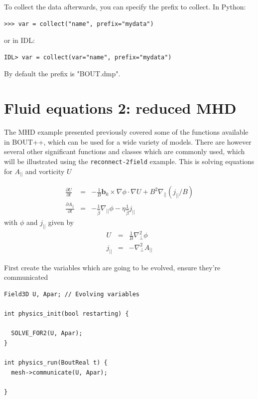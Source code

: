 \documentclass[12pt]{article}
\newcommand{\deriv}[2]{\ensuremath{\frac{\partial #1}{\partial #2}}}
\begin{document}
To collect the data afterwards, you can specify the prefix to collect. In Python:
\begin{verbatim}
>>> var = collect("name", prefix="mydata")
\end{verbatim}
or in IDL:
\begin{verbatim}
IDL> var = collect(var="name", prefix="mydata")
\end{verbatim}

By default the prefix is "BOUT.dmp".


\section{Fluid equations 2: reduced MHD}

The MHD example presented previously covered some of the functions available in BOUT++,
which can be used for a wide variety of models. There are however several other significant
functions and classes which are commonly used, which will be illustrated using the
\texttt{reconnect-2field} example. This is solving equations for $A_{||}$ and
vorticity $U$

\begin{eqnarray*}
\deriv{U}{t} &=& -\frac{1}{B}\mathbf{b}_0\times\nabla\phi\cdot\nabla U + B^2 \nabla_{||}\left(j_{||} / B\right) \\
\deriv{A_{||}}{t} &=& -\frac{1}{\hat{\beta}}\nabla_{||}\phi - \eta\frac{1}{\hat{\beta}} j_{||}
\end{eqnarray*}
with $\phi$ and $j_{||}$ given by
\begin{eqnarray*}
U &=& \frac{1}{B}\nabla_\perp^2\phi \\
j_{||} &=& -\nabla_\perp^2 A_{||}
\end{eqnarray*}

First create the variables which are going to be evolved, ensure they're
communicated

\begin{lstlisting}
Field3D U, Apar; // Evolving variables

int physics_init(bool restarting) {

  SOLVE_FOR2(U, Apar);
}

int physics_run(BoutReal t) {
  mesh->communicate(U, Apar);

}
\end{lstlisting}
\end{document}

